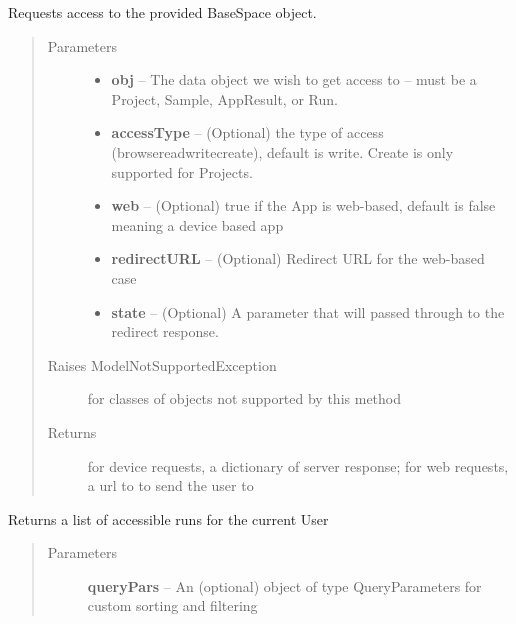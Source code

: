 \documentclass[letterpaper,10pt,english]{sphinxmanual}
\begin{document}
\begin{fulllineitems}
\begin{fulllineitems}
\label{Available modules:BaseSpacePy.api.BaseSpaceAPI.BaseSpaceAPI.getAccess}
Requests access to the provided BaseSpace object.
\begin{quote}\begin{description}
\item[{Parameters}] \leavevmode\begin{itemize}
\item {} 
\textbf{obj} -- The data object we wish to get access to -- must be a Project, Sample, AppResult, or Run.

\item {} 
\textbf{accessType} -- (Optional) the type of access (browse\textbar{}read\textbar{}write\textbar{}create), default is write. Create is only supported for Projects.

\item {} 
\textbf{web} -- (Optional) true if the App is web-based, default is false meaning a device based app

\item {} 
\textbf{redirectURL} -- (Optional) Redirect URL for the web-based case

\item {} 
\textbf{state} -- (Optional) A parameter that will passed through to the redirect response.

\end{itemize}

\item[{Raises ModelNotSupportedException}] \leavevmode
for classes of objects not supported by this method

\item[{Returns}] \leavevmode
for device requests, a dictionary of server response; for web requests, a url to to send the user to

\end{description}\end{quote}

\end{fulllineitems}


\begin{fulllineitems}
\label{Available modules:BaseSpacePy.api.BaseSpaceAPI.BaseSpaceAPI.getAccessibleRunsByUser}
Returns a list of accessible runs for the current User
\begin{quote}\begin{description}
\item[{Parameters}] \leavevmode
\textbf{queryPars} -- An (optional) object of type QueryParameters for custom sorting and filtering


\end{description}
\end{quote}
\end{fulllineitems}
\end{fulllineitems}
\end{document}
